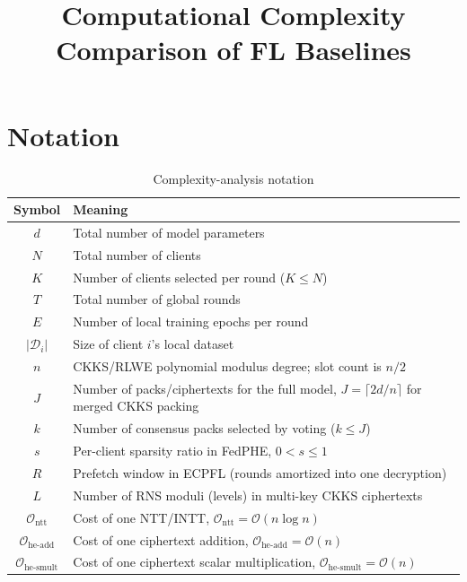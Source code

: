 \documentclass[a4paper,11pt]{article}
\begin{document}
\title{Computational Complexity Comparison of FL Baselines}
\author{}
\date{}
\maketitle

\section{Notation}
\label{sec:notation}

\begin{table}[h]
\centering
\caption{Complexity-analysis notation}
\label{tab:comp-notation}
\renewcommand{\arraystretch}{1.15}
\small
\begin{tabular}{c>{\raggedright\arraybackslash}p{\dimexpr\linewidth-3.5cm}}
\toprule
\textbf{Symbol} & \textbf{Meaning} \\
\midrule
$d$ & Total number of model parameters \\
$N$ & Total number of clients \\
$K$ & Number of clients selected per round ($K\le N$) \\
$T$ & Total number of global rounds \\
$E$ & Number of local training epochs per round \\
$|\mathcal{D}_i|$ & Size of client $i$'s local dataset \\
$n$ & CKKS/RLWE polynomial modulus degree; slot count is $n/2$ \\
$J$ & Number of packs/ciphertexts for the full model, $J=\lceil 2d/n\rceil$ for merged CKKS packing \\
$k$ & Number of consensus packs selected by voting ($k\le J$) \\
$s$ & Per-client sparsity ratio in FedPHE, $0<s\le 1$ \\
$R$ & Prefetch window in ECPFL (rounds amortized into one decryption) \\
$L$ & Number of RNS moduli (levels) in multi-key CKKS ciphertexts \\
$\mathcal{O}_{\text{ntt}}$ & Cost of one NTT/INTT, $\mathcal{O}_{\text{ntt}}=\mathcal{O}(n\log n)$ \\
$\mathcal{O}_{\text{he-add}}$ & Cost of one ciphertext addition, $\mathcal{O}_{\text{he-add}}=\mathcal{O}(n)$ \\
$\mathcal{O}_{\text{he-smult}}$ & Cost of one ciphertext scalar multiplication, $\mathcal{O}_{\text{he-smult}}=\mathcal{O}(n)$ \\
\bottomrule
\end{tabular}
\end{table}
\end{document}

